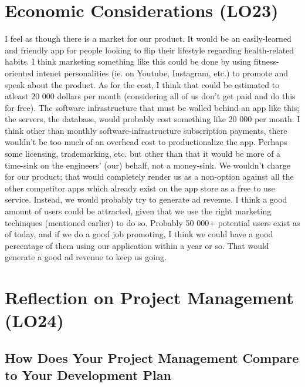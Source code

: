 \documentclass{article}
\begin{document}
\section{Economic Considerations (LO23)}
I feel as though there is a market for our product. It would be an easily-learned and friendly app for people looking to flip their lifestyle regarding health-related habits. I think marketing something like this could be done by using fitness-oriented intenet personalities (ie. on Youtube, Instagram, etc.) to promote and speak about the product. As for the cost, I think that could be estimated to atleast 20 000 dollars per month (considering all of us don't get paid and do this for free). The software infrastructure that must be walled behind an app like this; the servers, the database, would probably cost something like 20 000 per month. I think other than monthly software-infrastructure subscription payments, there wouldn't be too much of an overhead cost to productionalize the app. Perhaps some licensing, trademarking, etc. but other than that it would be more of a time-sink on the engineers' (our) behalf, not a money-sink.  We wouldn't charge for our product; that would completely render us as a non-option against all the other competitor apps which already exist on the app store as a free to use service. Instead, we would probably try to generate ad revenue. I think a good amount of users could be attracted, given that we use the right marketing techinques (mentioned earlier) to do so. Probably 50 000+ potential users exist as of today, and if we do a good job promoting, I think we could have a good percentage of them using our application within a year or so. That would generate a good ad revenue to keep us going.\\

\section{Reflection on Project Management (LO24)}


\subsection{How Does Your Project Management Compare to Your Development Plan}

\end{document}
